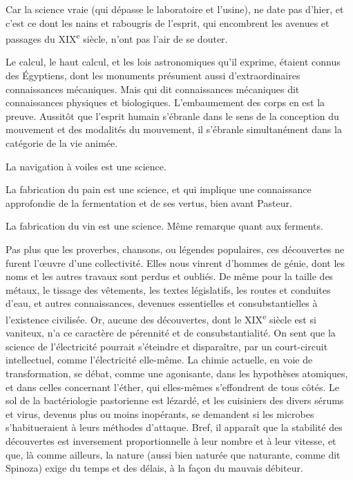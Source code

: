 \documentclass[french,twoside]{book} %
\begin{document}
Car la science vraie (qui dépasse le laboratoire et l’usine), ne date pas d’hier, et c’est ce dont les nains et rabougris de l’esprit, qui encombrent les avenues et passages du XIX\textsuperscript{e} siècle, n’ont pas l’air de se douter.\par
Le calcul, le haut calcul, et les lois astronomiques qu’il exprime, étaient connus des Égyptiens, dont les monuments présument aussi d’extraordinaires connaissances mécaniques. Mais qui dit connaissances mécaniques dit connaissances physiques et biologiques. L’embaumement des corps en est la preuve. Aussitôt que l’esprit humain s’ébranle dans le sens de la conception du mouvement et des modalités du mouvement, il s’ébranle simultanément dans la catégorie de la vie animée.\par
La navigation à voiles est une science.\par
La fabrication du pain est une science, et qui implique une connaissance approfondie de la fermentation et de ses vertus, bien avant Pasteur.\par
La fabrication du vin est une science. Même remarque quant aux ferments.\par
Pas plus que les proverbes, chansons, ou légendes populaires, ces découvertes ne furent l’œuvre d’une collectivité. Elles nous vinrent d’hommes de génie, dont les noms et les autres travaux sont perdus et oubliés. De même pour la taille des métaux, le tissage des vêtements, les textes législatifs, les routes et conduites d’eau, et autres connaissances, devenues essentielles et consubstantielles à l’existence civilisée. Or, aucune des découvertes, dont le XIX\textsuperscript{e} siècle est si vaniteux, n’a ce caractère de pérennité et de consubstantialité. On sent que la science de l’électricité pourrait s’éteindre et disparaître, par un court-circuit intellectuel, comme l’électricité elle-même. La chimie actuelle, en voie de transformation, se débat, comme une agonisante, dans les hypothèses atomiques, et dans celles concernant l’éther, qui elles-mêmes s’effondrent de tous côtés. Le sol de la bactériologie pastorienne est lézardé, et les cuisiniers des divers sérums et virus, devenus plus ou moins inopérants, se demandent si les microbes s’habitueraient à leurs méthodes d’attaque. Bref, il apparaît que la stabilité des découvertes est inversement proportionnelle à leur nombre et à leur vitesse, et que, là comme ailleurs, la nature (aussi bien naturée que naturante, comme dit Spinoza) exige du temps et des délais, à la façon du mauvais débiteur.\par
\end{document}
